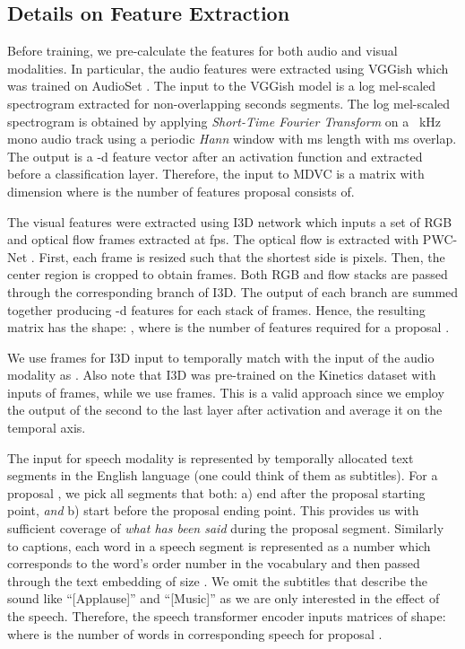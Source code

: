 \documentclass[10pt,twocolumn,letterpaper]{article}
\begin{document}
\subsection{Details on Feature Extraction} \label{sec:feat_extraction}
Before training, we pre-calculate the features for both audio and visual modalities. In particular, the audio features were extracted using VGGish \cite{Hershey2017} which was trained on AudioSet \cite{Gemmeke2017}. The input to the VGGish model is a  log mel-scaled spectrogram extracted for non-overlapping  seconds segments. The log mel-scaled spectrogram is obtained by applying \textit{Short-Time Fourier Transform} on a ~kHz mono audio track using a periodic \textit{Hann} window with  ms length with  ms overlap. The output is a -d feature vector after an activation function and extracted before a classification layer. Therefore, the input to MDVC is a matrix with dimension  where  is the number of features proposal  consists of.

The visual features were extracted using I3D \cite{Carreira2017} network which inputs a set of  RGB and optical flow frames extracted at  fps. The optical flow is extracted with PWC-Net \cite{Sun2018PWC-Net}. First, each frame is  resized such that the shortest side is  pixels. Then, the center region is cropped to obtain  frames. Both RGB and flow stacks are passed through the corresponding branch of I3D. The output of each branch are summed together producing -d features for each stack of  frames. Hence, the resulting matrix has the shape: , where  is the number of features required for a proposal .

We use  frames for I3D input to temporally match with the input of the audio modality as . Also note that I3D was pre-trained on the Kinetics dataset with inputs of  frames, while we use  frames. This is a valid approach since we employ the output of the second to the last layer after activation and average it on the temporal axis.

The input for speech modality is represented by temporally allocated text segments in the English language (one could think of them as subtitles). For a proposal , we pick all segments that both: a) end after the proposal starting point, \textit{and} b) start before the proposal ending point. This provides us with sufficient coverage of \textit{what has been said} during the proposal segment. Similarly to captions, each word in a speech segment is represented as a number which corresponds to the word's order number in the vocabulary and then passed through the text embedding of size . We omit the subtitles that describe the sound like ``[Applause]'' and ``[Music]'' as we are only interested in the effect of the speech. Therefore, the speech transformer encoder inputs matrices of shape:  where  is the number of words in corresponding speech for proposal .
\end{document}
